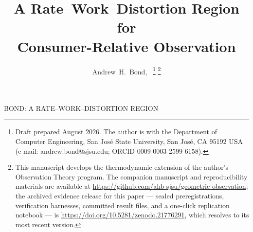 \documentclass[letterpaper,onecolumn]{IEEEtran}
\theoremstyle{definition}
\theoremstyle{remark}
\newcommand{\1}{\mathbf{1}}
\begin{document}
\title{A Rate--Work--Distortion Region for\\Consumer-Relative Observation}

\author{Andrew~H.~Bond,~%
\thanks{Draft prepared August 2026. The author is with the Department of
Computer Engineering, San Jos\'e State University, San Jos\'e, CA 95192 USA
(e-mail: andrew.bond@sjsu.edu; ORCID 0009-0003-2599-6158).}%
\thanks{This manuscript develops the thermodynamic extension of the author's
Observation Theory program. The companion manuscript and reproducibility
materials are available at \url{https://github.com/ahb-sjsu/geometric-observation};
the archived evidence release for this paper --- sealed preregistrations,
verification harnesses, committed result files, and a one-click replication
notebook --- is \url{https://doi.org/10.5281/zenodo.21776291}, which resolves
to its most recent version.}}

%
{BOND: A RATE--WORK--DISTORTION REGION}

\maketitle
\end{document}
